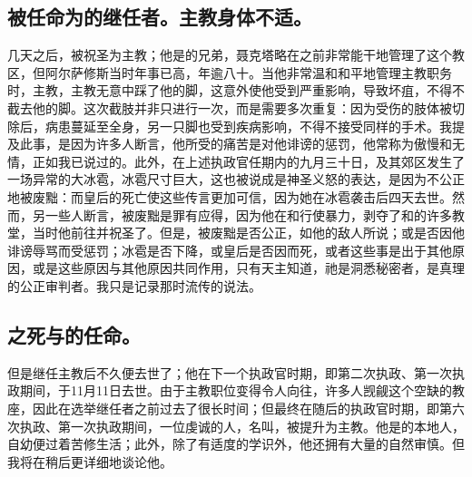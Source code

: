 
\subsection{被任命为的继任者。主教身体不适。}

几天之后，被祝圣为主教；他是的兄弟，聂克塔略在之前非常能干地管理了这个教区，但阿尔萨修斯当时年事已高，年逾八十。当他非常温和和平地管理主教职务时，主教，主教无意中踩了他的脚，这意外使他受到严重影响，导致坏疽，不得不截去他的脚。这次截肢并非只进行一次，而是需要多次重复：因为受伤的肢体被切除后，病患蔓延至全身，另一只脚也受到疾病影响，不得不接受同样的手术。我提及此事，是因为许多人断言，他所受的痛苦是对他诽谤的惩罚，他常称为傲慢和无情，正如我已说过的。此外，在上述执政官任期内的九月三十日，及其郊区发生了一场异常的大冰雹，冰雹尺寸巨大，这也被说成是神圣义怒的表达，是因为不公正地被废黜：而皇后的死亡使这些传言更加可信，因为她在冰雹袭击后四天去世。然而，另一些人断言，被废黜是罪有应得，因为他在和行使暴力，剥夺了和的许多教堂，当时他前往并祝圣了。但是，被废黜是否公正，如他的敌人所说；或是否因他诽谤辱骂而受惩罚；冰雹是否下降，或皇后是否因而死，或者这些事是出于其他原因，或是这些原因与其他原因共同作用，只有天主知道，祂是洞悉秘密者，是真理的公正审判者。我只是记录那时流传的说法。\par


\subsection{之死与的任命。}

但是继任主教后不久便去世了；他在下一个执政官时期，即第二次执政、第一次执政期间，于11月11日去世。由于主教职位变得令人向往，许多人觊觎这个空缺的教座，因此在选举继任者之前过去了很长时间；但最终在随后的执政官时期，即第六次执政、第一次执政期间，一位虔诚的人，名叫，被提升为主教。他是的本地人，自幼便过着苦修生活；此外，除了有适度的学识外，他还拥有大量的自然审慎。但我将在稍后更详细地谈论他。\par

